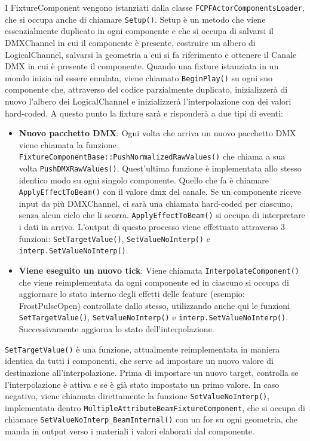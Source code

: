 \documentclass[main.tex]{subfiles}
\begin{document}
\noindent I FixtureComponent vengono istanziati dalla classe \lstinline{FCPFActorComponentsLoader}, che si occupa anche di chiamare \lstinline{Setup()}. Setup è un metodo che viene essenzialmente duplicato in ogni componente e che si occupa di salvarsi il DMXChannel in cui il componente è presente, costruire un albero di LogicalChannel, salvarsi la geometria a cui si fa riferimento e ottenere il Canale DMX in cui è presente il componente. Quando una fixture istanziata in un mondo inizia ad essere emulata, viene chiamato \lstinline{BeginPlay()} su ogni suo componente che, attraverso del codice parzialmente duplicato, inizializzerà di nuovo l'albero dei LogicalChannel e inizializzerà l'interpolazione con dei valori hard-coded. A questo punto la fixture sarà  e risponderà a due tipi di eventi:
\begin{itemize}
    \item \textbf{Nuovo pacchetto DMX}: Ogni volta che arriva un nuovo pacchetto DMX viene chiamata la funzione \lstinline{FixtureComponentBase::PushNormalizedRawValues()} che chiama a sua volta \lstinline{PushDMXRawValues()}. Quest'ultima funzione è implementata allo stesso identico modo su ogni singolo componente. Quello che fa è chiamare \lstinline{ApplyEffectToBeam()} con il valore dmx del canale. Se un componente riceve input da più DMXChannel, ci sarà una chiamata hard-coded per ciascuno, senza alcun ciclo che li scorra. \lstinline{ApplyEffectToBeam()} si occupa di interpretare i dati in arrivo. L'output di questo processo viene effettuato attraverso 3 funzioni: \lstinline{SetTargetValue()}, \lstinline{SetValueNoInterp()} e \lstinline{interp.SetValueNoInterp()}.
    \item \textbf{Viene eseguito un nuovo tick}: Viene chiamata \lstinline{InterpolateComponent()} che viene reimplementata da ogni componente ed in ciascuno si occupa di aggiornare lo stato interno degli effetti delle feature (esempio: FrostPulseOpen) controllate dallo stesso, utilizzando anche qui le funzioni \lstinline{SetTargetValue()}, \lstinline{SetValueNoInterp()} e \lstinline{interp.SetValueNoInterp()}. Successivamente aggiorna lo stato dell'interpolazione.
\end{itemize}
\lstinline{SetTargetValue()} è una funzione, attualmente reimplementata in maniera identica da tutti i componenti, che serve ad impostare un nuovo valore di destinazione all'interpolazione. Prima di impostare un nuovo target, controlla se l'interpolazione è attiva e se è già stato impostato un primo valore. In caso negativo, viene chiamata direttamente la funzione \lstinline{SetValueNoInterp()}, implementata dentro \lstinline{MultipleAttributeBeamFixtureComponent}, che si occupa di chiamare \lstinline{SetValueNoInterp_BeamInternal()} con un for su ogni geometria, che manda in output verso i materiali i valori elaborati dal componente.
\end{document}
